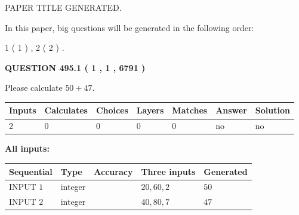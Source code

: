 \documentclass[12pt]{article}
\begin{document}
   
\vspace{0.2in}
   
   
   
   
   
   
   
   
 \vspace{0.2in}
 
 
 
 
   
   
 PAPER TITLE GENERATED.
   
   
   
\vspace{0.2in}
   
In this paper, big questions will be generated in the following order: 
   
   
   1 ( 1 )
 ,
   2 ( 2 )
 .
  
\vspace{0.2in}
  
{\textbf{\Large{QUESTION
495.1 
 ( 1 , 1 , 6791 )
}}}
  
  
 
Please calculate $ %
50 +  %
47 $.
 
 
   
   
   
   
\noindent\begin{tabular}{|l|l|l|l|l|l|l|}
 \hline
Inputs & Calculates & Choices & Layers & Matches & Answer & Solution \\ \hline
 2  & 
 0  & 
 0
  & 
 0  & 
 0  & 
  no & 
  no 
  \\ \hline
 \end{tabular}
   
   
   
   
\noindent{}
   
   
   
   
\noindent\vspace{0.1in}\hspace{-0.08in} {\textbf{\Large{All inputs: }}}
   
   
  
  
\noindent\begin{tabular}{|l|l|l|l|l|}
\hline
 Sequential & Type & Accuracy & Three inputs & Generated \\ 
\hline
 
 
  INPUT $  1 $ & integer &  & $
 20
 , 
 60
 , 
 2
 $ & $ 50 $ 
 \\  \hline  
 
 
  INPUT $  2 $ & integer &  & $
 40
 , 
 80
 , 
 7
 $ & $ 47 $ 
 \\  \hline  
 \end{tabular}
   
\end{document}
